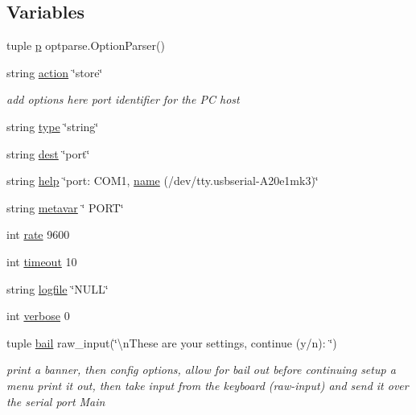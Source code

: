\subsection*{Variables}
\begin{DoxyCompactItemize}
\item 
tuple \hyperlink{namespace_lab1__483__pyinterface_a92d3a987526d8683f6eb098bc044694c}{p} optparse.\-Option\-Parser()
\item 
string \hyperlink{namespace_lab1__483__pyinterface_a6a30da6629d5b550c2025d3788d49cb9}{action} \char`\"{}store\char`\"{}
\begin{DoxyCompactList}\small\item\em add options here port identifier for the P\-C host \end{DoxyCompactList}\item 
string \hyperlink{namespace_lab1__483__pyinterface_acce15679d830831b0bbe8ebc2a60b2ca}{type} \char`\"{}string\char`\"{}
\item 
string \hyperlink{namespace_lab1__483__pyinterface_a66d4da94e0e4f717ff3e7f23c53f7c2d}{dest} \char`\"{}port\char`\"{}
\item 
string \hyperlink{namespace_lab1__483__pyinterface_abcce2312b2278db095fe85eb2260cb84}{help} \char`\"{}port\-: C\-O\-M1, \hyperlink{gas_8h_a8cc72c7acb2e8c5a34a460a505fece93}{name} (/dev/tty.\-usbserial-\/A20e1mk3)\char`\"{}
\item 
string \hyperlink{namespace_lab1__483__pyinterface_a7f4648aa9e6e34986cab1da2a58baf0a}{metavar} \char`\"{} P\-O\-R\-T\char`\"{}
\item 
int \hyperlink{namespace_lab1__483__pyinterface_a7a829e6fd74e94e0edf10550470d844c}{rate} 9600
\item 
int \hyperlink{namespace_lab1__483__pyinterface_a493b57f443cc38b3d3df9c1e584d9d82}{timeout} 10
\item 
string \hyperlink{namespace_lab1__483__pyinterface_ab8da723c3b7bcac2541f0d4a6c8d3c0d}{logfile} \char`\"{}N\-U\-L\-L\char`\"{}
\item 
int \hyperlink{namespace_lab1__483__pyinterface_a0b2caeb4b6f130be43e5a2f0267dd453}{verbose} 0
\item 
tuple \hyperlink{namespace_lab1__483__pyinterface_a67d4d94f824d1bec4405ed3b46596d5b}{bail} raw\-\_\-input(\char`\"{}\textbackslash{}n\-These are your settings, continue (y/n)\-: \char`\"{})
\begin{DoxyCompactList}\small\item\em print a banner, then config options, allow for bail out before continuing setup a menu print it out, then take input from the keyboard (raw-\/input) and send it over the serial port Main \end{DoxyCompactList}\item 

\end{DoxyCompactItemize}
